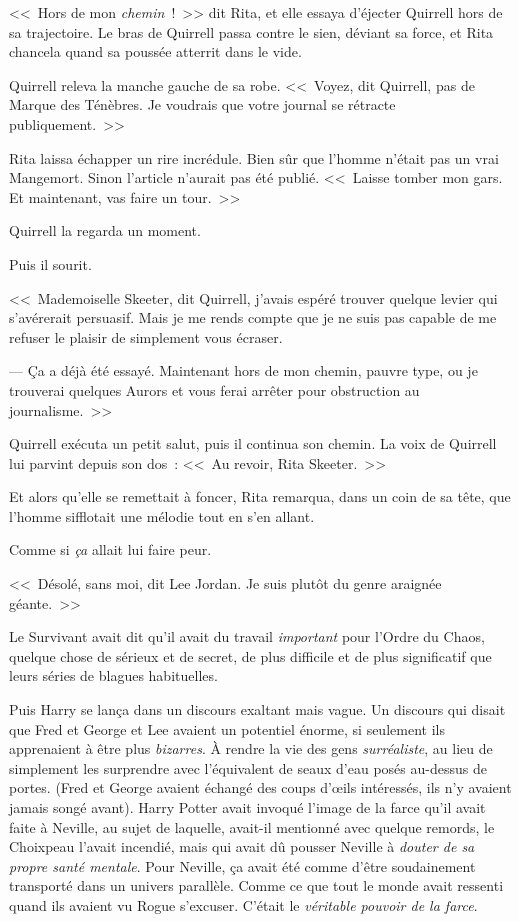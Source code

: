 <<~Hors de mon \emph{chemin}~!~>> dit Rita, et elle essaya d'éjecter Quirrell hors de sa trajectoire. Le bras de Quirrell passa contre le sien, déviant sa force, et Rita chancela quand sa poussée atterrit dans le vide.

Quirrell releva la manche gauche de sa robe. <<~Voyez, dit Quirrell, pas de Marque des Ténèbres. Je voudrais que votre journal se rétracte publiquement.~>>

Rita laissa échapper un rire incrédule. Bien sûr que l'homme n'était pas un vrai Mangemort. Sinon l'article n'aurait pas été publié. <<~Laisse tomber mon gars. Et maintenant, vas faire un tour.~>>

Quirrell la regarda un moment.

Puis il sourit.

<<~Mademoiselle Skeeter, dit Quirrell, j'avais espéré trouver quelque levier qui s'avérerait persuasif. Mais je me rends compte que je ne suis pas capable de me refuser le plaisir de simplement vous écraser.

--- Ça a déjà été essayé. Maintenant hors de mon chemin, pauvre type, ou je trouverai quelques Aurors et vous ferai arrêter pour obstruction au journalisme.~>>

Quirrell exécuta un petit salut, puis il continua son chemin. La voix de Quirrell lui parvint depuis son dos~: <<~Au revoir, Rita Skeeter.~>>

Et alors qu'elle se remettait à foncer, Rita remarqua, dans un coin de sa tête, que l'homme sifflotait une mélodie tout en s'en allant.

Comme si \emph{ça} allait lui faire peur.


<<~Désolé, sans moi, dit Lee Jordan. Je suis plutôt du genre araignée géante.~>>

Le Survivant avait dit qu'il avait du travail \emph{important} pour l'Ordre du Chaos, quelque chose de sérieux et de secret, de plus difficile et de plus significatif que leurs séries de blagues habituelles.

Puis Harry se lança dans un discours exaltant mais vague. Un discours qui disait que Fred et George et Lee avaient un potentiel énorme, si seulement ils apprenaient à être plus \emph{bizarres}. À rendre la vie des gens \emph{surréaliste}, au lieu de simplement les surprendre avec l'équivalent de seaux d'eau posés au-dessus de portes. (Fred et George avaient échangé des coups d'œils intéressés, ils n'y avaient jamais songé avant). Harry Potter avait invoqué l'image de la farce qu'il avait faite à Neville, au sujet de laquelle, avait-il mentionné avec quelque remords, le Choixpeau l'avait incendié, mais qui avait dû pousser Neville à \emph{douter de sa propre santé mentale}. Pour Neville, ça avait été comme d'être soudainement transporté dans un univers parallèle. Comme ce que tout le monde avait ressenti quand ils avaient vu Rogue s'excuser. C'était le \emph{véritable pouvoir de la farce}.

